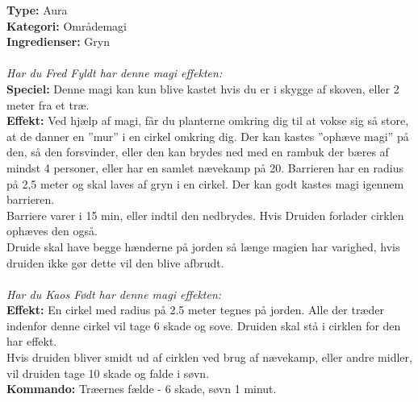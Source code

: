 \begin{nly*}
\textbf{Type:} Aura\\ 
\textbf{Kategori:} Områdemagi\\
\textbf{Ingredienser:} Gryn\\
\\
\emph{\textit{Har du Fred Fyldt har denne magi effekten:}}\\
\textbf{Speciel:} Denne magi kan kun blive kastet hvis du er i skygge af skoven, eller 2 meter fra et træ.\\
\textbf{Effekt:} Ved hjælp af magi, får du planterne omkring dig til at vokse sig så store, at de danner en ”mur” i en cirkel omkring dig. Der kan kastes ”ophæve magi” på den, så den forsvinder, eller den kan brydes ned med en rambuk der bæres af mindst 4 personer, eller har en samlet nævekamp på 20. Barrieren har en radius på 2,5 meter og skal laves af gryn i en cirkel. Der kan godt kastes magi igennem barrieren.\\
Barriere varer i 15 min, eller indtil den nedbrydes. Hvis Druiden forlader cirklen ophæves den også.\\
Druide skal have begge hænderne på jorden så længe magien har varighed, hvis druiden ikke gør dette vil den blive afbrudt.\\
\\
\emph{\textit{Har du Kaos Født har denne magi effekten:}}\\
\textbf{Effekt:} En cirkel med radius på 2.5 meter tegnes på jorden. Alle der træder indenfor denne cirkel vil tage 6 skade og sove. Druiden skal stå i cirklen for den har effekt.\\
Hvis druiden bliver smidt ud af cirklen ved brug af nævekamp, eller andre midler, vil druiden tage 10 skade og falde i søvn.\\
\textbf{Kommando:} Træernes fælde - 6 skade, søvn 1 minut.
\end{nly*}


